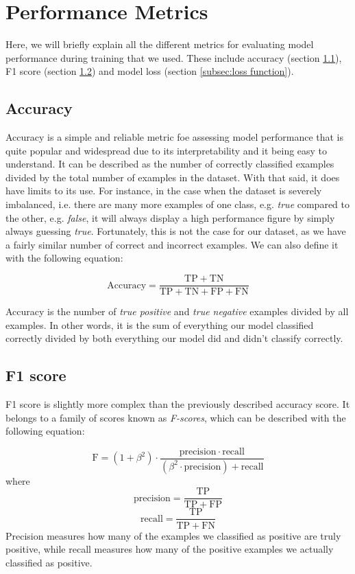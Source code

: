 \documentclass[times, utf8, diplomski, english]{fer_eng}
\begin{document}
\section{Performance Metrics}

Here, we will briefly explain all the different metrics for evaluating model performance during training that we used. These include accuracy (section \ref{subsec:accuracy}), F1 score (section \ref{subsec:f1 score}) and model loss (section \ref{subsec:loss function}).

\subsection{Accuracy}
\label{subsec:accuracy}

Accuracy is a simple and reliable metric foe assessing model performance that is quite popular and widespread due to its interpretability and it being easy to understand. It can be described as the number of correctly classified examples divided by the total number of examples in the dataset. With that said, it does have limits to its use. For instance, in the case when the dataset is severely imbalanced, i.e. there are many more examples of one class, e.g. \textit{true} compared to the other, e.g. \textit{false}, it will always display a high performance figure by simply always guessing \textit{true}. Fortunately, this is not the case for our dataset, as we have a fairly similar number of correct and incorrect examples. We can also define it with the following equation:

\[ \mathrm{Accuracy} = \frac{\mathrm{TP} + \mathrm{TN}}{\mathrm{TP} + \mathrm{TN} + \mathrm{FP} + \mathrm{FN}} \]

Accuracy is the number of \textit{true positive} and \textit{true negative} examples divided by all examples. In other words, it is the sum of everything our model classified correctly divided by both everything our model did and didn't classify correctly.

\subsection{F1 score}
\label{subsec:f1 score}

F1 score is slightly more complex than the previously described accuracy score. It belongs to a family of scores known as \textit{F-scores}, which can be described with the following equation:

\[ \mathrm{F} = (1 + \beta^2) \cdot \frac{\mathrm{precision} \cdot \mathrm{recall}}{(\beta^2 \cdot \mathrm{precision}) + \mathrm{recall}} \] where \[ \mathrm{precision} = \frac{\mathrm{TP}}{\mathrm{TP} + \mathrm{FP}} \] \[ \mathrm{recall} = \frac{\mathrm{TP}}{\mathrm{TP} + \mathrm{FN}} \]
Precision measures how many of the examples we classified as positive are truly positive, while recall measures how many of the positive examples we actually classified as positive.
\end{document}
